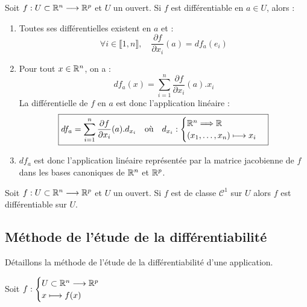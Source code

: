 \begin{theorem}
    Soit $f : U \subset \mathbb{R}^n \longrightarrow \mathbb{R}^p$ et $U$ un ouvert.
    Si $f$ est différentiable en $a \in U$, alors : 
    \begin{enumerate}
        \item Toutes ses différentielles existent en $a$ et : 
            \[ \forall i \in \llbracket 1, n \rrbracket, \quad \frac{ \partial f }{ \partial x_i}(a) = df_a(e_i) \]
        \item Pour tout $x \in \mathbb{R}^n$, on a : 
            \[ df_a(x) = \sum_{i=1}^{n} \frac{ \partial f}{ \partial x_i} (a) . x_i \] 
            La différentielle de $f$ en $a$ est donc l'application linéaire : 
            \[ \boxed{df_a = \sum_{i=1}^{n} \frac{ \partial f}{ \partial x_i} (a) . d_{x_i} 
            \quad \text{où} \quad 
            d_{x_i} : 
                \begin{cases}
                    \mathbb{R}^n \Longrightarrow \mathbb{R} \\ 
                    (x_1, \dots, x_n) \longmapsto x_i 
                \end{cases}} \] 
        \item $df_a$ est donc l'application linéaire représentée par la matrice jacobienne de $f$ dans les 
                bases canoniques de $\mathbb{R}^n$ et $\mathbb{R}^p$.  
    \end{enumerate} 
\end{theorem}

\begin{theorem}
    Soit $f : U \subset \mathbb{R}^n \longrightarrow \mathbb{R}^p$ et $U$ un ouvert.
    Si $f$ est de classe $ \mathcal{C}^1$ sur $U$ alors $f$ est différentiable sur $U$. 
\end{theorem}

\subsection{Méthode de l'étude de la différentiabilité}

Détaillons la méthode de l'étude de la différentiabilité d'une application. 

Soit $ f : 
    \begin{cases}
        U \subset \mathbb{R}^n \longrightarrow \mathbb{R}^p \\
        x \longmapsto f(x)
    \end{cases}$

